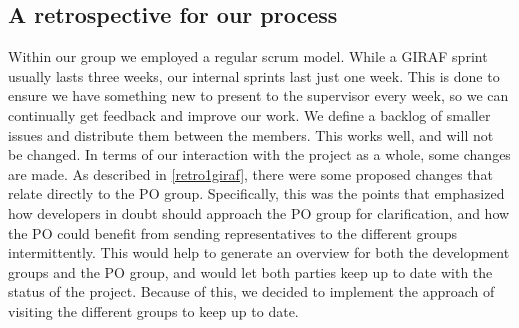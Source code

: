\subsection{A retrospective for our process}
Within our group we employed a regular scrum model.
While a GIRAF sprint usually lasts three weeks, our internal sprints last just one week.
This is done to ensure we have something new to present to the supervisor every week, so we can continually get feedback and improve our work.
We define a backlog of smaller issues and distribute them between the members.
This works well, and will not be changed.
In terms of our interaction with the project as a whole, some changes are made.
As described in \autoref{retro1giraf}, there were some proposed changes that relate directly to the PO group.
Specifically, this was the points that emphasized how developers in doubt should approach the PO group for clarification, and how the PO could benefit from sending representatives to the different groups intermittently. 
This would help to generate an overview for both the development groups and the PO group, and would let both parties keep up to date with the status of the project.
Because of this, we decided to implement the approach of visiting the different groups to keep up to date.
